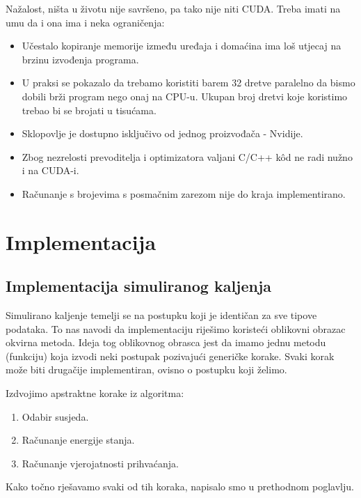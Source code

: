 \documentclass[times, utf8, zavrsni]{fer}
\begin{document}
Nažalost, ništa u životu nije savršeno, pa tako nije niti CUDA.
Treba imati na umu da i ona ima i neka ograničenja:

\begin{itemize}
\item
Učestalo kopiranje memorije između uređaja i domaćina ima loš
utjecaj na brzinu izvođenja programa.

\item
U praksi se pokazalo da trebamo koristiti barem 32 dretve paralelno
da bismo dobili brži program nego onaj na CPU-u. Ukupan broj dretvi
koje koristimo trebao bi se brojati u tisućama. 

\item
Sklopovlje je dostupno isključivo od jednog proizvođača - Nvidije. 

\item
Zbog nezrelosti prevoditelja i optimizatora valjani C/C++ kôd
ne radi nužno i na CUDA-i. 

\item
Računanje s brojevima s posmačnim zarezom nije do kraja implementirano. 
\end{itemize}






\chapter{Implementacija}

\section{Implementacija simuliranog kaljenja}
Simulirano kaljenje temelji se na postupku koji je identičan
za sve tipove podataka. To nas navodi da implementaciju 
riješimo koristeći oblikovni obrazac okvirna metoda. 
Ideja tog oblikovnog obrasca jest da imamo jednu
metodu (funkciju) koja izvodi neki postupak pozivajući
generičke korake. Svaki korak može biti drugačije implementiran,
ovisno o postupku koji želimo. 

Izdvojimo apstraktne korake iz algoritma:
\begin{enumerate}
\item 
Odabir susjeda.

\item
Računanje energije stanja.

\item
Računanje vjerojatnosti prihvaćanja.
\end{enumerate}
Kako točno rješavamo svaki od tih koraka, napisalo smo u
prethodnom poglavlju. 
\end{document}
